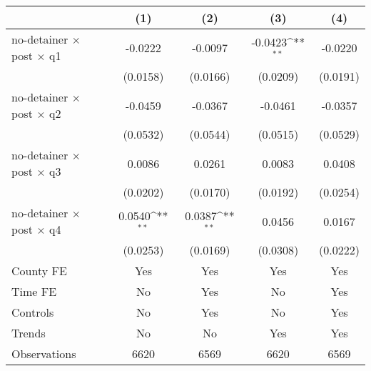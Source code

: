 {
\def\sym#1{\ifmmode^{#1}\else\(^{#1}\)\fi}
\begin{tabular*}{0.7\textwidth}{@{\hskip\tabcolsep\extracolsep\fill}l*{4}{c}}
\hline\hline
                    &\multicolumn{1}{c}{(1)}         &\multicolumn{1}{c}{(2)}         &\multicolumn{1}{c}{(3)}         &\multicolumn{1}{c}{(4)}         \\
\hline
no-detainer $\times$ post $\times$ q1&     -0.0222         &     -0.0097         &     -0.0423\sym{**} &     -0.0220         \\
                    &    (0.0158)         &    (0.0166)         &    (0.0209)         &    (0.0191)         \\
[1em]
no-detainer $\times$ post $\times$ q2&     -0.0459         &     -0.0367         &     -0.0461         &     -0.0357         \\
                    &    (0.0532)         &    (0.0544)         &    (0.0515)         &    (0.0529)         \\
[1em]
no-detainer $\times$ post $\times$ q3&      0.0086         &      0.0261         &      0.0083         &      0.0408         \\
                    &    (0.0202)         &    (0.0170)         &    (0.0192)         &    (0.0254)         \\
[1em]
no-detainer $\times$ post $\times$ q4&      0.0540\sym{**} &      0.0387\sym{**} &      0.0456         &      0.0167         \\
                    &    (0.0253)         &    (0.0169)         &    (0.0308)         &    (0.0222)         \\
[1em]
County FE           &         Yes         &         Yes         &         Yes         &         Yes         \\
[1em]
Time FE             &          No         &         Yes         &          No         &         Yes         \\
[1em]
Controls            &          No         &         Yes         &          No         &         Yes         \\
[1em]
Trends              &          No         &          No         &         Yes         &         Yes         \\
\hline
Observations        &        6620         &        6569         &        6620         &        6569         \\
\hline\hline
\end{tabular*}
}
